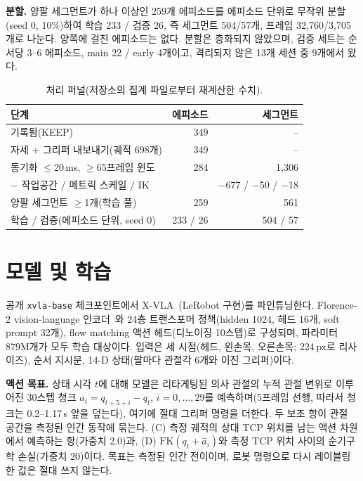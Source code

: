 \documentclass[conference,10pt]{IEEEtran}
\begin{document}
\textbf{분할.} 양팔 세그먼트가 하나 이상인 259개 에피소드를 에피소드 단위로 무작위 분할(seed 0, 10\%)하여 학습 233 / 검증 26, 즉
세그먼트 504/57개, 프레임 32{,}760/3{,}705개로 나눈다. 양쪽에 걸친 에피소드는 없다. 분할은 층화되지 않았으며, 검증 세트는 순서당 3--6
에피소드, main 22 / early 4개이고, 격리되지 않은 13개 세션 중 9개에서 왔다.

\begin{table}[t]
\centering\footnotesize
\caption{처리 퍼널(저장소의 집계 파일로부터 재계산한 수치).}
\label{p1:tab:funnel}
\setlength{\tabcolsep}{4pt}\begin{tabular}{@{}lrr@{}}
\toprule
단계 & 에피소드 & 세그먼트 \\
\midrule
기록됨(KEEP) & 349 & -- \\
자세 + 그리퍼 내보내기(궤적 698개) & 349 & -- \\
동기화 $\le$20\,ms, $\ge$65프레임 윈도 & 284 & 1{,}306 \\
\quad $-$ 작업공간 / 메트릭 스케일 / IK & & $-$677 / $-$50 / $-$18 \\
양팔 세그먼트 $\ge$1개(학습 풀) & 259 & 561 \\
\quad 학습 / 검증(에피소드 단위, seed 0) & 233 / 26 & 504 / 57 \\
\bottomrule
\end{tabular}
\end{table}

\section{모델 및 학습}\label{p1:sec:model}
공개 \texttt{xvla-base} 체크포인트에서 X-VLA~\cite{zheng2025xvla}(LeRobot 구현)를 파인튜닝한다. Florence-2 vision-language
인코더~\cite{xiao2024florence2}와 24층 트랜스포머 정책(hidden 1024, 헤드 16개, soft prompt 32개), flow matching 액션 헤드(디노이징
10스텝)로 구성되며, 파라미터 879M개가 모두 학습 대상이다. 입력은 세 시점(헤드, 왼손목, 오른손목; 224\,px로 리사이즈), 순서 지시문,
14-D 상태(팔마다 관절각 6개와 이진 그리퍼)이다.

\textbf{액션 목표.} 상태 시각 $t$에 대해 모델은 리타게팅된 의사 관절의 누적 관절 변위로 이루어진 30스텝 청크
$a_i = q_{t+5+i}-q_t$, $i=0,\dots,29$를 예측하며(5프레임 선행, 따라서 청크는 0.2--1.17\,s 앞을 덮는다), 여기에 절대 그리퍼 명령을
더한다. 두 보조 항이 관절 공간을 측정된 인간 동작에 묶는다. (C) 측정 궤적의 상대 TCP 위치를 남는 액션 차원에서 예측하는 항(가중치
2.0)과, (D) $\mathrm{FK}(q_t+\hat a_i)$와 측정 TCP 위치 사이의 순기구학 손실(가중치 20)이다. 목표는 측정된 인간 전이이며, 로봇
명령으로 다시 레이블링한 값은 절대 쓰지 않는다.
\end{document}
